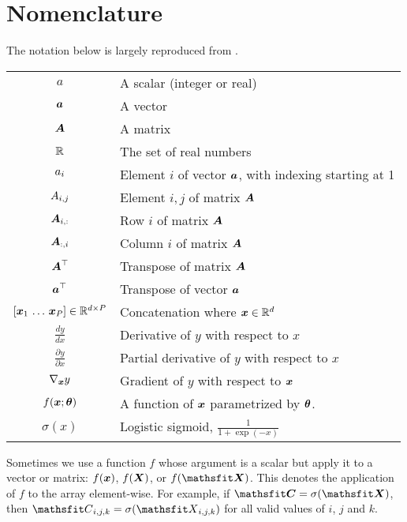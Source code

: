 \chapter{Nomenclature}
\label{section:Nomenclature}
The notation below is largely reproduced from \citet{Goodfellow-et-al-2016}.


\vspace{\notationgap}
\bgroup
\def\arraystretch{1.5}
\begin{tabular}{cp{3.25in}}
	$\displaystyle a$ & A scalar (integer or real)\\
	$\displaystyle {\bm{a}}$ & A vector\\
	$\displaystyle {\bm{A}}$ & A matrix\\
	$\displaystyle \mathbb{R}$ & The set of real numbers \\
	$\displaystyle {a}_i$ & Element $i$ of vector ${\bm{a}}$, with indexing starting at 1 \\
	$\displaystyle {A}_{i,j}$ & Element $i, j$ of matrix ${\bm{A}}$ \\
	$\displaystyle {\bm{A}}_{i, :}$ & Row $i$ of matrix ${\bm{A}}$ \\
	$\displaystyle {\bm{A}}_{:, i}$ & Column $i$ of matrix ${\bm{A}}$ \\
	$\displaystyle {\bm{A}}^\top$ & Transpose of matrix ${\bm{A}}$ \\
	$\displaystyle {\bm{a}}^\top$ & Transpose of vector ${\bm{a}}$ \\
	$[{\bm{x}}_1 \, \ldots \, {\bm{x}}_P] \in \mathbb{R}^{d \times P}$ & Concatenation where ${\bm{x}} \in \mathbb{R}^d$ \\
	$\frac{d y} {d x}$ & Derivative of $y$ with respect to $x$\\ [2ex]
	$\displaystyle \frac{\partial y} {\partial x} $ & Partial derivative of $y$ with respect to $x$ \\
	$\displaystyle \nabla_{\bm{x}} y $ & Gradient of $y$ with respect to ${\bm{x}}$ \\
	$\displaystyle f({\bm{x}} ; {\bm{\theta}}) $ & A function of ${\bm{x}}$ parametrized by ${\bm{\theta}}$. \\
	$\displaystyle \sigma(x)$ & Logistic sigmoid, $\displaystyle \frac{1} {1 + \exp(-x)}$ \\
\end{tabular}
\egroup

Sometimes we use a function $f$ whose argument is a scalar but apply
it to a vector or matrix: $f({\bm{x}})$, $f({\bm{X}})$, or $f(\tX)$.
This denotes the application of $f$ to the
array element-wise. For example, if $\tC = \sigma(\tX)$, then $\etC_{i,j,k} = \sigma(\etX_{i,j,k})$
for all valid values of $i$, $j$ and $k$.